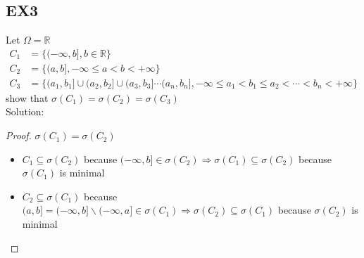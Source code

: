 \subsection*{EX3}
Let $ \Omega=\mathbb{R} $
\begin{align*}{}{}
C_1&=\{(-\infty,b],b\in \mathbb{R}\}\\C_2&=\{(a,b],-\infty\leq a<b<+\infty\}
\\C_3&=\{(a_1,b_1]\cup(a_2,b_2]\cup(a_3,b_3]\cdots(a_n,b_n],-\infty\leq a_1<b_1\leq a_2<\cdots<b_n<+\infty\}
\end{align*}
show that $ \sigma(C_1)=\sigma(C_2)=\sigma(C_3) $
\\Solution:
\begin{proof}
    $ \sigma(C_1)=\sigma(C_2) $ 
    \begin{itemize}
    \item $ C_1\subseteq \sigma(C_2) $ because $(-\infty,b]\in \sigma(C_2) \Rightarrow \sigma(C_1)\subseteq\sigma(C_2)$ because $ \sigma(C_1) $ is minimal
    \item $ C_2\subseteq \sigma(C_1) $ because $ (a,b]=(-\infty,b]\backslash(-\infty ,a]\in \sigma(C_1) \Rightarrow \sigma(C_2)\subseteq\sigma(C_1)$ because $ \sigma(C_2) $ is minimal 
    \end{itemize}
\end{proof}
